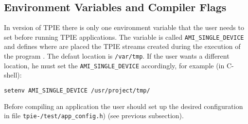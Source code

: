 
\subsection{Environment Variables and Compiler Flags}
\label{sec:comp-flags}


In version \version of TPIE there is only one environment variable that the
user needs to set before running TPIE applications. The variable is called
\verb|AMI_SINGLE_DEVICE| and defines where are placed the TPIE streams
created during the execution of the program . The defaut location is
\verb|/var/tmp|. If the user wants a different location, he must set the
\verb|AMI_SINGLE_DEVICE| accordingly, for example (in C-shell):

\begin{verbatim}
setenv AMI_SINGLE_DEVICE /usr/project/tmp/
\end{verbatim}

Before compiling an application the user should set up the desired
configuration in  file {\tt tpie-\version/test/app\_config.h}) (see
previous subsection).


